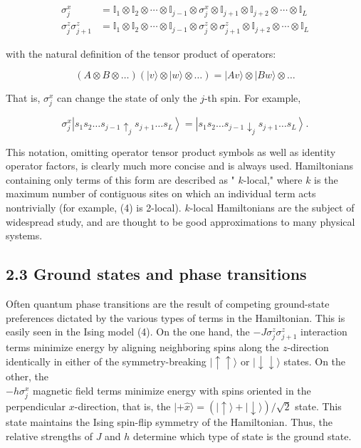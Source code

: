 \documentclass[12pt]{article}
\begin{document}
\begin{align*}
\sigma_{j}^{x} & =\mathbb{I}_{1} \otimes \mathbb{I}_{2} \otimes \cdots \otimes \mathbb{I}_{j-1} \otimes \sigma_{j}^{x} \otimes \mathbb{I}_{j+1} \otimes \mathbb{I}_{j+2} \otimes \cdots \otimes \mathbb{I}_{L}  \tag{5}\\
\sigma_{j}^{z} \sigma_{j+1}^{z} & =\mathbb{I}_{1} \otimes \mathbb{I}_{2} \otimes \cdots \otimes \mathbb{I}_{j-1} \otimes \sigma_{j}^{z} \otimes \sigma_{j+1}^{z} \otimes \mathbb{I}_{j+2} \otimes \cdots \otimes \mathbb{I}_{L} \tag{6}
\end{align*}


with the natural definition of the tensor product of operators:


\begin{equation*}
(A \otimes B \otimes \ldots)(|v\rangle \otimes|w\rangle \otimes \ldots)=|A v\rangle \otimes|B w\rangle \otimes \ldots \tag{7}
\end{equation*}


That is, $\sigma_{j}^{x}$ can change the state of only the $j$-th spin. For example,


\begin{equation*}
\sigma_{j}^{x}\left|s_{1} s_{2} \ldots s_{j-1} \uparrow_{j} s_{j+1} \ldots s_{L}\right\rangle=\left|s_{1} s_{2} \ldots s_{j-1} \downarrow_{j} s_{j+1} \ldots s_{L}\right\rangle . \tag{8}
\end{equation*}


This notation, omitting operator tensor product symbols as well as identity operator factors, is clearly much more concise and is always used. Hamiltonians containing only terms of this form are described as " $k$-local," where $k$ is the maximum number of contiguous sites on which an individual term acts nontrivially (for example, (4) is 2-local). $k$-local Hamiltonians are the subject of widespread study, and are thought to be good approximations to many physical systems.

\subsection*{2.3 Ground states and phase transitions}
Often quantum phase transitions are the result of competing ground-state preferences dictated by the various types of terms in the Hamiltonian. This is easily seen in the Ising model (4). On the one hand, the $-J \sigma_{j}^{z} \sigma_{j+1}^{z}$ interaction terms minimize energy by aligning neighboring spins along the $z$-direction identically in either of the symmetry-breaking $|\uparrow \uparrow\rangle$ or $|\downarrow \downarrow\rangle$ states. On the other, the\\
$-h \sigma_{j}^{x}$ magnetic field terms minimize energy with spins oriented in the perpendicular $x$-direction, that is, the $|+\hat{x}\rangle=(|\uparrow\rangle+|\downarrow\rangle) / \sqrt{2}$ state. This state maintains the Ising spin-flip symmetry of the Hamiltonian. Thus, the relative strengths of $J$ and $h$ determine which type of state is the ground state.
\end{document}
